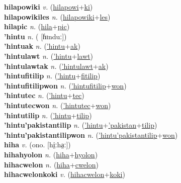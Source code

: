 \textbf{hilapowiki} \textit{v.} (\hyperref[hilapowi]{hilapowi}+\hyperref[ki]{ki})
 \label{hilapowiki} \\
\textbf{hilapowikiles} \textit{n.} (\hyperref[hilapowiki]{hilapowiki}+\hyperref[les]{les})
 \label{hilapowikiles} \\
\textbf{hilapic} \textit{n.} (\hyperref[hila]{hila}+\hyperref[pic]{pic})
 \label{hilapic} \\
\textbf{'hintu} \textit{n.} ( [ɦɪnduː])
 \label{'hintu} \\
\textbf{'hintuak} \textit{n.} (\hyperref['hintu]{'hintu}+\hyperref[ak]{ak})
 \label{'hintuak} \\
\textbf{'hintulawt} \textit{n.} (\hyperref['hintu]{'hintu}+\hyperref[lawt]{lawt})
 \label{'hintulawt} \\
\textbf{'hintulawtak} \textit{n.} (\hyperref['hintulawt]{'hintulawt}+\hyperref[ak]{ak})
 \label{'hintulawtak} \\
\textbf{'hintufitilip} \textit{n.} (\hyperref['hintu]{'hintu}+\hyperref[fitilip]{fitilip})
 \label{'hintufitilip} \\
\textbf{'hintufitilipwon} \textit{n.} (\hyperref['hintufitilip]{'hintufitilip}+\hyperref[won]{won})
 \label{'hintufitilipwon} \\
\textbf{'hintutec} \textit{n.} (\hyperref['hintu]{'hintu}+\hyperref[tec]{tec})
 \label{'hintutec} \\
\textbf{'hintutecwon} \textit{n.} (\hyperref['hintutec]{'hintutec}+\hyperref[won]{won})
 \label{'hintutecwon} \\
\textbf{'hintutilip} \textit{n.} (\hyperref['hintu]{'hintu}+\hyperref[tilip]{tilip})
 \label{'hintutilip} \\
\textbf{'hintu'pakistantilip} \textit{n.} (\hyperref['hintu]{'hintu}+\hyperref['pakistan]{'pakistan}+\hyperref[tilip]{tilip})
 \label{'hintu'pakistantilip} \\
\textbf{'hintu'pakistantilipwon} \textit{n.} (\hyperref['hintu'pakistantilip]{'hintu'pakistantilip}+\hyperref[won]{won})
 \label{'hintu'pakistantilipwon} \\
\textbf{hiha} \textit{v.} (ono. [hi̤ːha̤ː])
 \label{hiha} \\
\textbf{hihahyolon} \textit{n.} (\hyperref[hiha]{hiha}+\hyperref[hyolon]{hyolon})
 \label{hihahyolon} \\
\textbf{hihacwelon} \textit{n.} (\hyperref[hiha]{hiha}+\hyperref[cwelon]{cwelon})
 \label{hihacwelon} \\
\textbf{hihacwelonkoki} \textit{v.} (\hyperref[hihacwelon]{hihacwelon}+\hyperref[koki]{koki})

